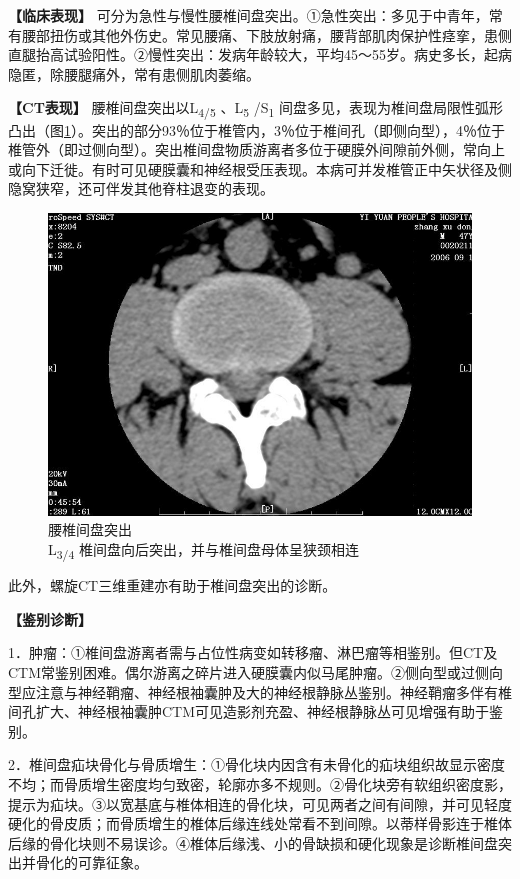 \textbf{【临床表现】}
可分为急性与慢性腰椎间盘突出。①急性突出：多见于中青年，常有腰部扭伤或其他外伤史。常见腰痛、下肢放射痛，腰背部肌肉保护性痉挛，患侧直腿抬高试验阳性。②慢性突出：发病年龄较大，平均45～55岁。病史多长，起病隐匿，除腰腿痛外，常有患侧肌肉萎缩。

\textbf{【CT表现】} 腰椎间盘突出以L\textsubscript{4/5}
、L\textsubscript{5} /S\textsubscript{1}
间盘多见，表现为椎间盘局限性弧形凸出（图\ref{fig23-7}）。突出的部分93％位于椎管内，3％位于椎间孔（即侧向型），4％位于椎管外（即过侧向型）。突出椎间盘物质游离者多位于硬膜外间隙前外侧，常向上或向下迁徙。有时可见硬膜囊和神经根受压表现。本病可并发椎管正中矢状径及侧隐窝狭窄，还可伴发其他脊柱退变的表现。

\begin{figure}[!htbp]
 \centering
 \includegraphics[width=.7\textwidth,height=\textheight,keepaspectratio]{./images/Image00470.jpg}
 \captionsetup{justification=centering}
 \caption{腰椎间盘突出\\{\small L\textsubscript{3/4} 椎间盘向后突出，并与椎间盘母体呈狭颈相连}}
 \label{fig23-7}
  \end{figure} 

此外，螺旋CT三维重建亦有助于椎间盘突出的诊断。

\textbf{【鉴别诊断】}

1．肿瘤：①椎间盘游离者需与占位性病变如转移瘤、淋巴瘤等相鉴别。但CT及CTM常鉴别困难。偶尔游离之碎片进入硬膜囊内似马尾肿瘤。②侧向型或过侧向型应注意与神经鞘瘤、神经根袖囊肿及大的神经根静脉丛鉴别。神经鞘瘤多伴有椎间孔扩大、神经根袖囊肿CTM可见造影剂充盈、神经根静脉丛可见增强有助于鉴别。

2．椎间盘疝块骨化与骨质增生：①骨化块内因含有未骨化的疝块组织故显示密度不均；而骨质增生密度均匀致密，轮廓亦多不规则。②骨化块旁有软组织密度影，提示为疝块。③以宽基底与椎体相连的骨化块，可见两者之间有间隙，并可见轻度硬化的骨皮质；而骨质增生的椎体后缘连线处常看不到间隙。以蒂样骨影连于椎体后缘的骨化块则不易误诊。④椎体后缘浅、小的骨缺损和硬化现象是诊断椎间盘突出并骨化的可靠征象。

